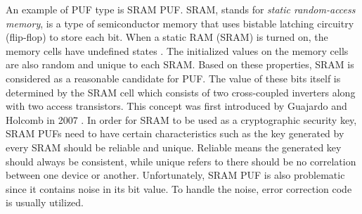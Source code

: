 An example of PUF type is SRAM PUF. SRAM, stands for \textit{static random-access memory}, is a type of semiconductor memory that uses bistable latching circuitry (flip-flop) to store each bit. When a static RAM (SRAM) is turned on, the memory cells have undefined states \cite{tuyls_2010}. The initialized values on the memory cells are also random and unique to each SRAM. Based on these properties, SRAM is considered as a reasonable candidate for PUF. The value of these bits itself is determined by the SRAM cell which consists of two cross-coupled inverters along with two access transistors. This concept was first introduced by Guajardo and Holcomb in 2007 \cite{guajardo_kumar_schrijen_tuyls}. In order for SRAM to be used as a cryptographic security key, SRAM PUFs need to have certain characteristics such as the key generated by every SRAM should be reliable and unique. Reliable means the generated key should always be consistent, while unique refers to there should be no correlation between one device or another.
Unfortunately, SRAM PUF is also problematic since it contains noise in its bit value. To handle the noise, error correction code is usually utilized.



